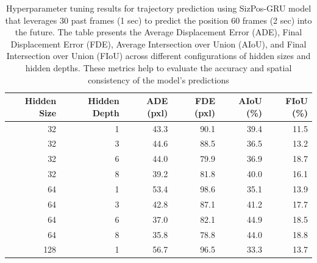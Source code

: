 \documentclass[12pt,oneside]{book} %
\begin{document}
\begin{table}[H]
    \centering
    \caption{Hyperparameter tuning results for trajectory prediction using SizPos-GRU model that leverages 30 past frames (1 sec) to predict the position 60 frames (2 sec) into the future. The table presents the Average Displacement Error (ADE), Final Displacement Error (FDE), Average Intersection over Union (AIoU), and Final Intersection over Union (FIoU) across different configurations of hidden sizes and hidden depths. These metrics help to evaluate the accuracy and spatial consistency of the model’s predictions}
    \begin{adjustbox}{width=0.6\textwidth}
        \begin{tabular}{rrrrrr}
            \toprule
            \textbf{Hidden Size} & \textbf{Hidden Depth} & \textbf{ADE (pxl)} & \textbf{FDE (pxl)} & \textbf{AIoU (\%)} & \textbf{FIoU (\%)} \\ 
            \midrule
            32                   & 1                     & 43.3               & 90.1               & 39.4               & 11.5               \\
            32                   & 3                     & 44.6               & 88.5               & 36.5               & 13.2               \\
            32                   & 6                     & 44.0               & 79.9               & 36.9               & 18.7               \\
            32                   & 8                     & 39.2               & 81.8               & 40.0               & 16.1               \\
            64                   & 1                     & 53.4               & 98.6               & 35.1               & 13.9               \\
            64                   & 3                     & 42.8               & 87.1               & 41.2               & 17.7               \\
            64                   & 6                     & 37.0               & 82.1               & 44.9               & 18.5               \\
            64                   & 8                     & 35.8               & 78.8               & 44.0               & 18.8               \\
            128                  & 1                     & 56.7               & 96.5               & 33.3               & 13.7               \\

\end{tabular}
\end{adjustbox}
\end{table}
\end{document}
